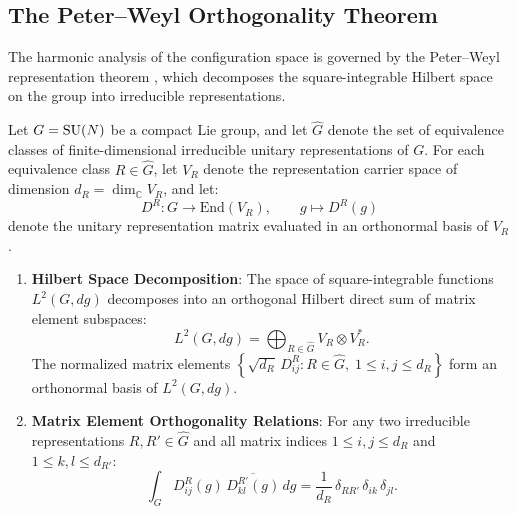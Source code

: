 \subsection{The Peter--Weyl Orthogonality Theorem}
\label{subsec:peter_weyl_orthogonal}
The harmonic analysis of the configuration space is governed by the Peter--Weyl representation theorem \cite{StreaterWightman1964}, which decomposes the square-integrable Hilbert space on the group into irreducible representations.
\begin{theorem}
\label{thm:peter_weyl_ch2}
Let $G = \mathrm{SU}(N)$ be a compact Lie group, and let $\widehat{G}$ denote the set of equivalence classes of finite-dimensional irreducible unitary representations of $G$. For each equivalence class $R \in \widehat{G}$, let $V_R$ denote the representation carrier space of dimension $d_R = \dim_{\mathbb{C}} V_R$, and let:
\begin{equation}
D^R : G \to \mathrm{End}(V_R), \qquad g \mapsto D^R(g)
\end{equation}
denote the unitary representation matrix evaluated in an orthonormal basis of $V_R$.
\begin{enumerate}
    \item \textbf{Hilbert Space Decomposition}: The space of square-integrable functions $L^2(G, dg)$ decomposes into an orthogonal Hilbert direct sum of matrix element subspaces:
    \begin{equation}
    L^2(G, dg) = \bigoplus_{R \in \widehat{G}} V_R \otimes V_R^*.
    \end{equation}
    The normalized matrix elements $\left\{ \sqrt{d_R} \, D^R_{ij} : R \in \widehat{G}, \; 1 \le i, j \le d_R \right\}$ form an orthonormal basis of $L^2(G, dg)$.
    \item \textbf{Matrix Element Orthogonality Relations}: For any two irreducible representations $R, R' \in \widehat{G}$ and all matrix indices $1 \le i, j \le d_R$ and $1 \le k, l \le d_{R'}$:
    \begin{equation}
    \label{eq:matrix_orthogonality}
    \int_G D^R_{ij}(g) \, \overline{D^{R'}_{kl}(g)} \, dg = \frac{1}{d_R} \, \delta_{RR'} \, \delta_{ik} \, \delta_{jl}.
    \end{equation}
\end{enumerate}
\end{theorem}

